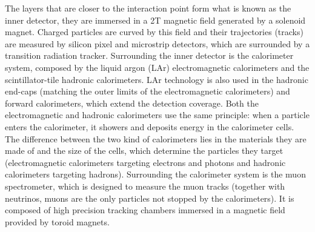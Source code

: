 \documentclass[main]{subfiles} %
\begin{document}
The layers \cite{Airapetian1999} that are closer to the interaction point form what is known as the inner detector, they are immersed in a 2\;T magnetic field generated by a solenoid magnet. Charged particles are curved by this field and their trajectories (tracks) are measured by silicon pixel and microstrip detectors, which are surrounded by a transition radiation tracker. Surrounding the inner detector is the calorimeter system, composed by the liquid argon (LAr) electromagnetic calorimeters and the scintillator-tile hadronic calorimeters. LAr technology is also used in the hadronic end-caps (matching the outer limits of the electromagnetic calorimeters) and forward calorimeters, which extend the detection coverage. Both the electromagnetic and hadronic calorimeters use the same principle: when a particle enters the calorimeter, it showers and deposits energy in the calorimeter cells. The difference between the two kind of calorimeters lies in the materials they are made of and the size of the cells, which determine the particles they target (electromagnetic calorimeters targeting electrons and photons and hadronic calorimeters targeting hadrons). Surrounding the calorimeter system is the muon spectrometer, which is designed to measure the muon tracks (together with neutrinos, muons are the only particles not stopped by the calorimeters). It is composed of high precision tracking chambers immersed in a magnetic field provided by toroid magnets.\\



















\biblio
\end{document}
